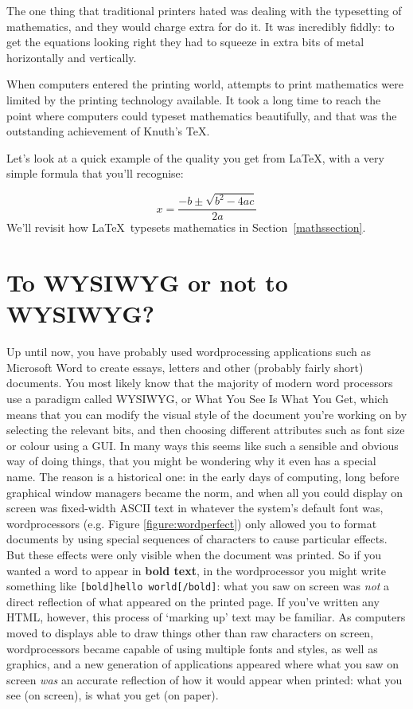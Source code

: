 \begin{refsection}
The one thing that traditional printers hated was dealing with the typesetting of mathematics, and they would charge extra for do it. It was incredibly fiddly: to get the equations looking right they had to squeeze in extra bits of metal horizontally and vertically. 

When computers entered the printing world, attempts to print mathematics were limited by the printing technology available. It took a long time to reach the point where computers could typeset mathematics beautifully, and that was the outstanding achievement of Knuth's \TeX.

Let's look at a quick example of the quality you get from \LaTeX, with a very simple formula that you'll recognise:

\[ x = \frac{-b \pm \sqrt{b^2-4ac}}{2a} \]
%
We'll revisit how \LaTeX\ typesets mathematics in Section~\ref{mathssection}.

\section{To WYSIWYG or not to WYSIWYG?}
Up until now, you have probably used wordprocessing applications such as Microsoft Word to create essays, letters and other (probably fairly short) documents. You most likely know that the majority of modern word processors use a paradigm called WYSIWYG, or What You See Is What You Get, which means that you can modify the visual style of the document you're working on by selecting the relevant bits, and then choosing different attributes such as font size or colour using a GUI. In many ways this seems like such a sensible and obvious way of doing things, that you might be wondering why it even has a special name. The reason is a historical one: in the early days of computing, long before graphical window managers became the norm, and when all you could display on screen was fixed-width ASCII text in whatever the system's default font was, wordprocessors (e.g. Figure \ref{figure:wordperfect}) only allowed you to format documents by using special sequences of characters to cause particular effects. But these effects were only visible when the document was printed. So if you wanted a word to appear in \textbf{bold text}, in the wordprocessor you might write something like \texttt{[bold]hello world[/bold]}: what you saw on screen was \emph{not} a direct reflection of what appeared on the printed page. If you've written any HTML, however, this process of `marking up' text may be familiar. As computers moved to displays able to draw things other than raw characters on screen, wordprocessors became capable of using multiple fonts and styles, as well as graphics, and a new generation of applications appeared where what you saw on screen \emph{was} an accurate reflection of how it would appear when printed: what you see (on screen), is what you get (on paper). 


\end{refsection}
